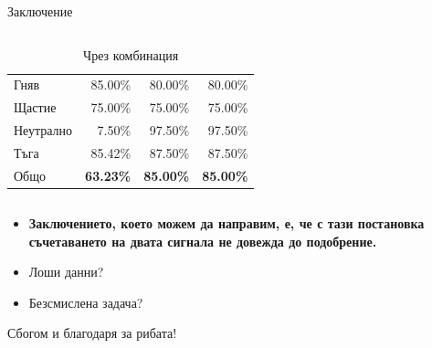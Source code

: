 \documentclass[9pt]{beamer}
\begin{document}
\begin{frame}[t]{Заключение}
\begin{columns}
\begin{column}{0.48\textwidth}
\begin{table}[h]
\begin{center}
{\begin{tabular}{|l|r r r|}
                            Гняв      & 85.00\%          & 80.00\%          & 80.00\%          \\
                            Щастие    & 75.00\%          & 75.00\%          & 75.00\%          \\
                            Неутрално & 7.50\%           & 97.50\%          & 97.50\%          \\
                            Тъга      & 85.42\%          & 87.50\%          & 87.50\%          \\
                            \hline
                            \hline
                            Общо      & \textbf{63.23\%} & \textbf{85.00\%} & \textbf{85.00\%} \\
                            \hline
                        \end{tabular}}
                        \caption*{Чрез комбинация}
                    \end{center}
                    \end{table}
                \end{column}
        \end{columns}
        \begin{center}
            \begin{itemize}
                \pause
                \item \textbf{Заключението, което можем да направим, е, че с тази постановка съчетаването на двата сигнала не довежда до подобрение.}
                \pause
                \item Лоши данни?
                \pause
                \item Безсмислена задача?
            \end{itemize}
            \vspace{2cm}
            \pause
            {\footnotesize Сбогом и благодаря за рибата!}
        \end{center}
    \end{frame}
\end{document}
